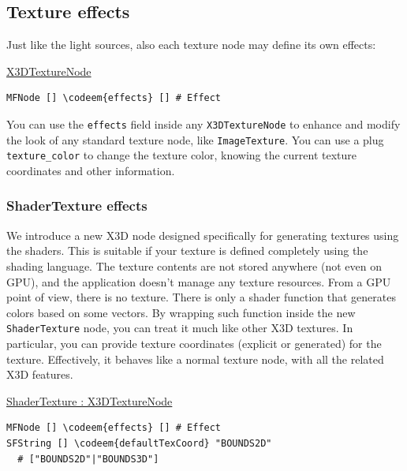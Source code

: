 \documentclass{egpubl}
\newenvironment{mycode}
{\begin{mycodecore}}
{\end{mycodecore}
\vspace{-0.1in}}
\newcommand*{\codeem}[1]{\textbf{#1}}
\begin{document}
\subsection{Texture effects}

Just like the light sources, also each texture node may define its own effects:

\begin{mycode}
\underline{X3DTextureNode}
\begin{Verbatim}[commandchars=\\\{\},fontsize=\small]
MFNode [] \codeem{effects} [] # Effect
\end{Verbatim}
\end{mycode}

You can use the \texttt{effects} field
inside any \texttt{X3DTextureNode} to enhance and modify the look of any
standard texture node, like \texttt{ImageTexture}.
You can use a plug \texttt{texture\_color} to change the texture color,
knowing the current texture coordinates and other information.

\subsubsection{ShaderTexture effects}

We introduce a new X3D node designed specifically for generating
textures using the shaders. This is suitable
if your texture is defined completely using the shading language.
The texture contents are not stored anywhere (not even on GPU),
and the application doesn't manage any texture resources.
From a GPU point of view, there is no texture.
There is only a shader function that generates colors
based on some vectors. By wrapping such function inside
the new \texttt{ShaderTexture} node, you can treat it much like other X3D textures.
In particular, you can provide texture coordinates (explicit or generated)
for the texture.
Effectively, it behaves like a normal texture node, with all the related
X3D features.


\begin{mycode}
\underline{ShaderTexture : X3DTextureNode}
\begin{Verbatim}[commandchars=\\\{\},fontsize=\small]
MFNode [] \codeem{effects} [] # Effect
SFString [] \codeem{defaultTexCoord} "BOUNDS2D"
  # ["BOUNDS2D"|"BOUNDS3D"]
\end{Verbatim}
\end{mycode}
\end{document}
